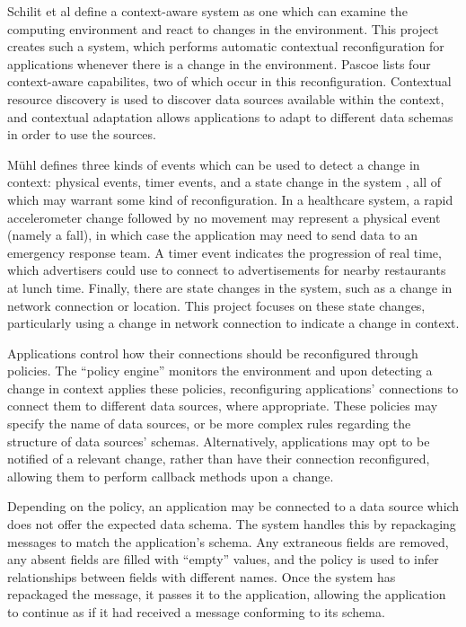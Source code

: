 \documentclass[12pt,twoside,notitlepage]{report}
\begin{document}
Schilit et al \cite{schilit1994context}  define a context-aware system as one which can examine the computing environment and react to changes in the environment. 
This project creates such a system, which performs automatic contextual reconfiguration for applications whenever there is a change in the environment. 
Pascoe \cite{pascoe1998adding} lists four context-aware capabilites, two of which occur in this reconfiguration. 
Contextual resource discovery is used to discover data sources available within the context, and contextual adaptation allows applications to adapt to different data schemas in order to use the sources. 

M\"{u}hl defines three kinds of events which can be used to detect a change in context: physical events, timer events, and a state change in the system \cite[page 11]{muhl2006distributed}, all of which may warrant some kind of reconfiguration. 
In a healthcare system, a rapid accelerometer change followed by no movement may represent a physical event (namely a fall), in which case the application may need to send data to an emergency response team.
A timer event indicates the progression of real time, which advertisers could use to connect to advertisements for nearby restaurants at lunch time. 
Finally, there are state changes in the system, such as a change in network connection or location. 
This project focuses on these state changes, particularly using a change in network connection to indicate a change in context. 

Applications control how their connections should be reconfigured through policies. 
The ``policy engine'' monitors the environment and upon detecting a change in context applies these policies, reconfiguring applications' connections to connect them to different data sources, where appropriate.
These policies may specify the name of data sources, or be more complex rules regarding the structure of data sources' schemas. 
Alternatively, applications may opt to be notified of a relevant change, rather than have their connection reconfigured, allowing them to perform callback methods upon a change.

Depending on the policy, an application may be connected to a data source which does not offer the expected data schema. 
The system handles this by repackaging messages to match the application's schema. Any extraneous fields are removed, any absent fields are filled with ``empty'' values, and the policy is used to infer relationships between fields with different names. 
Once the system has repackaged the message, it passes it to the application, allowing the application to continue as if it had received a message conforming to its schema.
\end{document}

